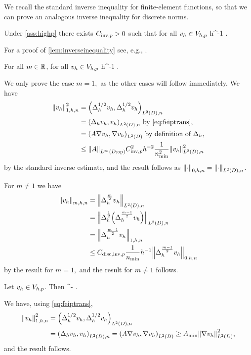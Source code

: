 We recall the standard inverse inequality for finite-element functions, so that we can prove an analogous inverse inequality for discrete norms.

\label{lem:inverseinequality}
Under \cref{ass:highp} there exists $C_{\mathrm{inv},p} > 0$ such that for all $v_{h} \in V_{h,p}$
\beqs
\NHoD{\vh} \leq \CinvVhp h^{-1} \NLtD{\vh}.
\eeqs
\ele

For a proof of \cref{lem:inverseinequality} see, e.g., \cite[Theorem 4.5.11 and Remark 4.5.20]{BrSc:08}.

\label{lem:inversediscrete}
For all $m \in \mathbb R$, for all $v_{h} \in V_{h,p}$
\beqs
\Nmhn{\vh} \leq \Chinv {} h^{-1} \Nmmohn{\vh}.
\eeqs
\ele

We only prove the case $m=1,$ as the other cases will follow immediately. We have
\begin{align*}
\Nfn{1,h,n}{\vh}^2 &= \IPLtDn{\Deltahh \vh}{\Deltahh \vh}\\
&= \IPLtDn{\Deltah \vh}{\vh} \text{ by \cref{eq:feiptrans},}\\
&= \IPLtD{A \grad \vh}{\grad \vh} \text{ by definition of } \Deltah,\\
&\leq \NLiDop{A} \CinvVhp^2 h^{-2}\frac{1}{\nmin^2} \NLtDn{\vh}^2
\end{align*}
by the standard inverse estimate, and the result follows as $\Nzhn{\cdot} = \NLtDn{\cdot}$.

For $m \neq 1$ we have
\begin{align*}
  \Nmhn{\vh} &= \NLtDn{\Deltah^{\frac{m}2}\vh}\\
  &= \NLtDn{\Deltah^{\half}\mleft(\Deltah^{\frac{m-1}2}\vh\mright)}\\
  &= \Nohn{\Deltah^{\frac{m-1}2}\vh}\\
  &\leq \Chinv \frac{1}{\nmin} h^{-1} \Nzhn{\Deltah^{\frac{m-1}2}\vh}\\
\end{align*}
by the result for $m=1,$ and the result for $m\neq 1$ follows.
\epf

\label{lem:h1contdisc}
Let $v_{h} \in V_{h,p}$. Then
\beqs
\SNHoD{\vh} \leq \Amin^{-\half} \Nohn{\vh}.
\eeqs
\ele

We have, using \cref{eq:feiptrans},
\begin{align*}
  \Nohn{\vh}^2 &= \IPLtDn{\Deltahh \vh}{\Deltahh \vh}\\
  &= \IPLtDn{\Deltah \vh}{\vh}= \IPLtD{A \grad \vh}{\grad \vh} \geq \Amin \NLtD{\grad \vh}^2,
\end{align*}
and the result follows.
\epf

